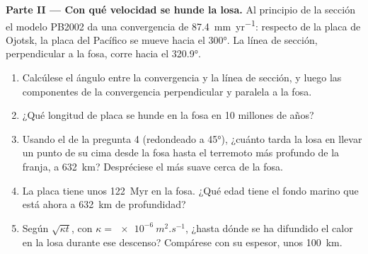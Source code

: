 \begin{problem}
\medskip
\noindent\textbf{Parte II --- Con qué velocidad se hunde la losa.} Al principio de la sección el modelo PB2002 da una convergencia de
\qty{87.4}{mm.yr^{-1}}: respecto de la placa de Ojotsk, la placa del Pacífico se mueve hacia el  \ang{300}. La línea de sección,
perpendicular a la fosa, corre hacia el  \ang{320.9}.
\begin{enumerate}[resume]
  \item Calcúlese el ángulo entre la convergencia y la línea de sección, y luego las componentes de la convergencia perpendicular y paralela a la fosa.
  \item ¿Qué longitud de placa se hunde en la fosa en 10 millones de años?
  \item Usando el  de la pregunta 4 (redondeado a \ang{45}), ¿cuánto tarda la losa en llevar un punto de su cima desde la fosa hasta el
        terremoto más profundo de la franja, a \qty{632}{km}? Despréciese el  más suave cerca de la fosa.
  \item La placa tiene unos \qty{122}{Myr} en la fosa. ¿Qué edad tiene el fondo marino que está ahora a \qty{632}{km} de profundidad?
  \item Según $\sqrt{\kappa t}$, con $\kappa = \qty{e-6}{m^2.s^{-1}}$, ¿hasta dónde se ha difundido el calor en la losa durante ese descenso? Compárese
        con su espesor, unos \qty{100}{km}.
\end{enumerate}


\end{problem}
